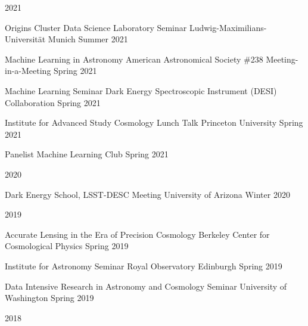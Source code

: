 \documentclass[11pt,letterpaper]{article}
\begin{document}
\nopagebreak\begin{list}{}{\malzlist}
	\item 2021
\nopagebreak\begin{list}{}{\malzlist}
\item \talk{}
	{Origins Cluster Data Science Laboratory Seminar}
	{Ludwig-Maximilians-Universit{\"a}t Munich}%
	{Summer 2021}
\item {}
	{Machine Learning in Astronomy}%
	{American Astronomical Society \#238 Meeting-in-a-Meeting}
	{Spring 2021}
\item \talk{}
	{Machine Learning Seminar}
	{Dark Energy Spectroscopic Instrument (DESI) Collaboration}
	{Spring 2021}
\item \talk{}
	{Institute for Advanced Study Cosmology Lunch Talk}
	{Princeton University}
	{Spring 2021}
\item \talk{}
	{Panelist}
	{Machine Learning Club}
	{Spring 2021}
\end{list}
\item 2020
\nopagebreak\begin{list}{}{\malzlist}
\item {}
	{Dark Energy School, LSST-DESC Meeting}
	{University of Arizona}
	{Winter 2020}
\end{list}
\item 2019
\nopagebreak\begin{list}{}{\malzlist}
\item {}
  {Accurate Lensing in the Era of Precision Cosmology}
	{Berkeley Center for Cosmological Physics}
	{Spring 2019}
\item {}
  {Institute for Astronomy Seminar}
	{Royal Observatory Edinburgh}
	{Spring 2019}
\item {}
  {Data Intensive Research in Astronomy and Cosmology Seminar}
	{University of Washington}
	{Spring 2019}
	\end{list}
\item 2018
\nopagebreak\begin{list}{}{\malzlist}
\item {}

\end{list}
\end{list}
\end{document}
